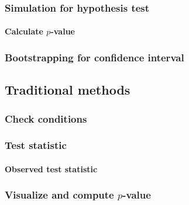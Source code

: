 \documentclass[12pt, krantz2,]{krantz}
\let\oldparagraph\paragraph
\renewcommand{\paragraph}[1]{\oldparagraph{#1}\mbox{}}
\begin{document}
\hypertarget{simulation-for-hypothesis-test}{%
\subsubsection*{Simulation for hypothesis test}\label{simulation-for-hypothesis-test}}


\hypertarget{calculate-p-value-1}{%
\paragraph{\texorpdfstring{Calculate \(p\)-value}{Calculate p-value}}\label{calculate-p-value-1}}

\hypertarget{bootstrapping-for-confidence-interval-1}{%
\subsubsection*{Bootstrapping for confidence interval}\label{bootstrapping-for-confidence-interval-1}}


\hypertarget{traditional-methods-1}{%
\subsection{Traditional methods}\label{traditional-methods-1}}

\hypertarget{check-conditions-1}{%
\subsubsection*{Check conditions}\label{check-conditions-1}}


\hypertarget{test-statistic-1}{%
\subsubsection*{Test statistic}\label{test-statistic-1}}


\hypertarget{observed-test-statistic-1}{%
\paragraph{Observed test statistic}\label{observed-test-statistic-1}}

\hypertarget{visualize-and-compute-p-value}{%
\subsubsection*{\texorpdfstring{Visualize and compute \(p\)-value}{Visualize and compute p-value}}\label{visualize-and-compute-p-value}}
\end{document}
